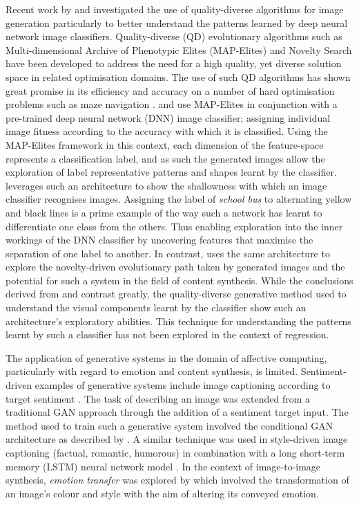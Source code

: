 \documentclass{article}
\begin{document}
Recent work by \citet{nguyen2015innovation} and \citet{nguyen2015deep} investigated the use of quality-diverse algorithms for image generation particularly to better understand the patterns learned by deep neural network image classifiers.
Quality-diverse (QD) evolutionary algorithms such as Multi-dimensional Archive of Phenotypic Elites (MAP-Elites) \citep{mouret2015illuminating} and Novelty Search \citep{lehman2008exploiting, lehman2011abandoning} have been developed to address the need for a high quality, yet diverse solution space in related optimisation domains.
The use of such QD algorithms has shown great promise in its efficiency and accuracy on a number of hard optimisation problems \citep{pugh2016quality} such as maze navigation \citep{lehman2011abandoning}.
\citet{nguyen2015deep} and \citet{nguyen2015innovation} use MAP-Elites in conjunction with a pre-trained deep neural network (DNN) image classifier; assigning individual image fitness according to the accuracy with which it is classified.
Using the MAP-Elites framework in this context, each dimension of the feature-space represents a classification label, and as such the generated images allow the exploration of label representative patterns and shapes learnt by the classifier.
\citet{nguyen2015deep} leverages such an architecture to show the shallowness with which an image classifier recognises images.
Assigning the label of \textit{school bus} to alternating yellow and black lines is a prime example of the way such a network has learnt to differentiate one class from the others.
Thus enabling exploration into the inner workings of the DNN classifier by uncovering features that maximise the separation of one label to another.
In contrast, \citet{nguyen2015innovation} uses the same architecture to explore the novelty-driven evolutionary path taken by generated images and the potential for such a system in the field of content synthesis.
While the conclusions derived from \citet{nguyen2015innovation} and \citet{nguyen2015deep} contrast greatly, the quality-diverse generative method used to understand the visual components learnt by the classifier show such an architecture's exploratory abilities.
This technique for understanding the patterns learnt by such a classifier has not been explored in the context of regression.

The application of generative systems in the domain of affective computing, particularly with regard to emotion and content synthesis, is limited.
Sentiment-driven examples of generative systems include image captioning according to target sentiment \citep{mathews2016senticap}.
The task of describing an image was extended from a traditional GAN approach through the addition of a sentiment target input.
The method used to train such a generative system involved the conditional GAN architecture as described by \citet{gauthier2014conditional}.
A similar technique was used in style-driven image captioning (factual, romantic, humorous) in combination with a long short-term memory (LSTM) neural network model \citet{gan2017stylenet}.
In the context of image-to-image synthesis, \textit{emotion transfer} was explored by \citet{ali2017emotional} which involved the transformation of an image's colour and style with the aim of altering its conveyed emotion.
\end{document}
